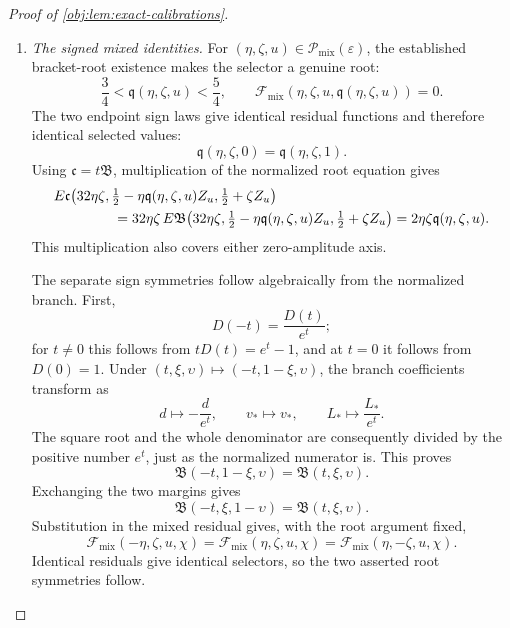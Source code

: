 \documentclass[11pt]{article}
\begin{document}
\begin{proof}[Proof of \cref{obj:lem:exact-calibrations}]
\begin{enumerate}
\item \emph{The signed mixed identities.}
For \((\eta,\zeta,u)\in\mathcal P_{\mathrm{mix}}(\varepsilon)\), the established bracket-root existence makes the selector a genuine root:
\[
\frac34<\mathfrak q(\eta,\zeta,u)<\frac54,
\qquad
\mathcal F_{\mathrm{mix}}
(\eta,\zeta,u,\mathfrak q(\eta,\zeta,u))=0.
\]
The two endpoint sign laws give identical residual functions and therefore identical selected values:
\[
\mathfrak q(\eta,\zeta,0)=\mathfrak q(\eta,\zeta,1).
\]
Using \(\mathfrak c=t\mathfrak B\), multiplication of the normalized root equation gives
\[
\begin{aligned}
&E\mathfrak c
\bigl(32\eta\zeta,
\tfrac12-\eta\mathfrak q(\eta,\zeta,u)Z_u,
\tfrac12+\zeta Z_u\bigr)\\
&\hspace{15mm}
=32\eta\zeta\,E\mathfrak B
\bigl(32\eta\zeta,
\tfrac12-\eta\mathfrak q(\eta,\zeta,u)Z_u,
\tfrac12+\zeta Z_u\bigr)
=2\eta\zeta\mathfrak q(\eta,\zeta,u).
\end{aligned}
\]
This multiplication also covers either zero-amplitude axis.

The separate sign symmetries follow algebraically from the normalized branch. First,
\[
D(-t)=\frac{D(t)}{e^t};
\]
for \(t\ne0\) this follows from \(tD(t)=e^t-1\), and at \(t=0\) it follows from \(D(0)=1\). Under
\((t,\xi,\upsilon)\mapsto(-t,1-\xi,\upsilon)\), the branch coefficients transform as
\[
d\mapsto-\frac d{e^t},
\qquad
v_*\mapsto v_*,
\qquad
L_*\mapsto\frac{L_*}{e^t}.
\]
The square root and the whole denominator are consequently divided by the positive number \(e^t\), just as the normalized numerator is. This proves
\[
\mathfrak B(-t,1-\xi,\upsilon)
=\mathfrak B(t,\xi,\upsilon).
\]
Exchanging the two margins gives
\[
\mathfrak B(-t,\xi,1-\upsilon)
=\mathfrak B(t,\xi,\upsilon).
\]
Substitution in the mixed residual gives, with the root argument fixed,
\[
\mathcal F_{\mathrm{mix}}(-\eta,\zeta,u,\chi)
=\mathcal F_{\mathrm{mix}}(\eta,\zeta,u,\chi)
=\mathcal F_{\mathrm{mix}}(\eta,-\zeta,u,\chi).
\]
Identical residuals give identical selectors, so the two asserted root symmetries follow.


\end{enumerate}
\end{proof}
\end{document}
